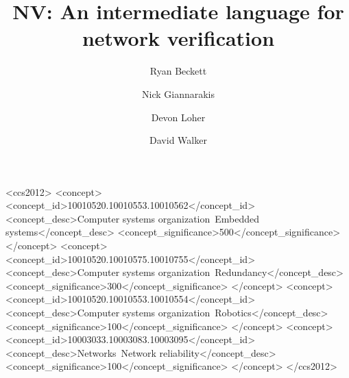 \documentclass[sigconf,10pt]{acmart}
\begin{document}
\title{NV: An intermediate language for network verification}

\author{Ryan Beckett}

\author{Nick Giannarakis}

\author{Devon Loher}

\author{David Walker}

\renewcommand{\shortauthors}{R. Beckett et al.}


\begin{CCSXML}
<ccs2012>
 <concept>
  <concept_id>10010520.10010553.10010562</concept_id>
  <concept_desc>Computer systems organization~Embedded systems</concept_desc>
  <concept_significance>500</concept_significance>
 </concept>
 <concept>
  <concept_id>10010520.10010575.10010755</concept_id>
  <concept_desc>Computer systems organization~Redundancy</concept_desc>
  <concept_significance>300</concept_significance>
 </concept>
 <concept>
  <concept_id>10010520.10010553.10010554</concept_id>
  <concept_desc>Computer systems organization~Robotics</concept_desc>
  <concept_significance>100</concept_significance>
 </concept>
 <concept>
  <concept_id>10003033.10003083.10003095</concept_id>
  <concept_desc>Networks~Network reliability</concept_desc>
  <concept_significance>100</concept_significance>
 </concept>
</ccs2012>
\end{CCSXML}




\maketitle

%
%
%
%
\end{document}
